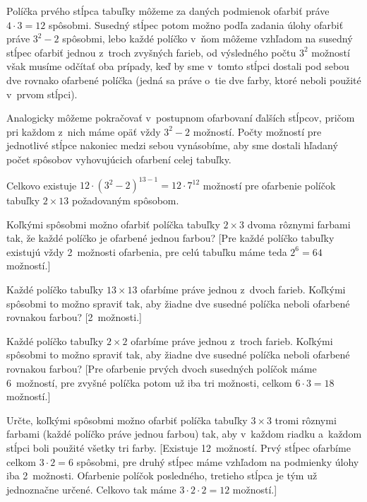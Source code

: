 {%
Políčka prvého stĺpca tabuľky môžeme za daných podmienok
ofarbiť práve $4\cdot 3=12$ spôsobmi.
Susedný stĺpec potom možno podľa zadania úlohy ofarbiť
práve $3^2-2$ spôsobmi, lebo každé políčko v~ňom môžeme vzhľadom
na susedný stĺpec ofarbiť jednou z~troch zvyšných farieb,
od výsledného počtu $3^2$ možností však musíme odčítať
oba prípady, keď by sme v~tomto stĺpci dostali pod sebou dve rovnako
ofarbené políčka (jedná sa práve o~tie dve farby, ktoré neboli použité v~prvom stĺpci).

Analogicky môžeme pokračovať v~postupnom ofarbovaní ďalších stĺpcov,
pričom pri každom z~nich máme opäť vždy $3^2-2$ možností.
Počty možností pre jednotlivé stĺpce nakoniec medzi sebou vynásobíme,
aby sme dostali hľadaný počet spôsobov vyhovujúcich ofarbení celej tabuľky.

\zaver
Celkovo existuje $12\cdot (3^2-2)^{13-1}=12\cdot
7^{12}$ možností pre ofarbenie políčok tabuľky $2\times 13$
požadovaným spôsobom.

Koľkými spôsobmi možno ofarbiť políčka tabuľky $2\times 3$ dvoma
rôznymi farbami tak, že každé políčko je ofarbené jednou farbou?
[Pre každé políčko tabuľky existujú vždy 2~možnosti ofarbenia, pre celú
tabuľku máme teda $2^6=64$ možností.]

Každé políčko tabuľky $13\times 13$ ofarbíme práve jednou z~dvoch farieb. Koľkými spôsobmi to možno spraviť tak, aby žiadne dve
susedné políčka neboli ofarbené rovnakou farbou?
[2~možnosti.]

Každé políčko tabuľky $2\times 2$ ofarbíme práve jednou z~troch
farieb. Koľkými spôsobmi to možno spraviť tak, aby žiadne dve
susedné políčka neboli ofarbené rovnakou farbou?
[Pre ofarbenie prvých dvoch susedných políčok máme 6~možností,
pre zvyšné políčka potom už iba tri možnosti, celkom $6\cdot3=18$ možností.]

\D
Určte, koľkými spôsobmi možno ofarbiť políčka tabuľky $3 \times 3$ tromi rôznymi farbami
(každé políčko práve jednou farbou) tak, aby v~každom riadku a~každom stĺpci boli použité
všetky tri farby.
[Existuje 12~možností. Prvý stĺpec ofarbíme celkom $3\cdot 2=6$ spôsobmi, pre druhý
stĺpec máme vzhľadom na podmienky úlohy iba 2~možnosti. Ofarbenie políčok posledného,
tretieho stĺpca je tým už jednoznačne určené. Celkovo tak máme $3\cdot 2\cdot 2=12$ možností.]
}

